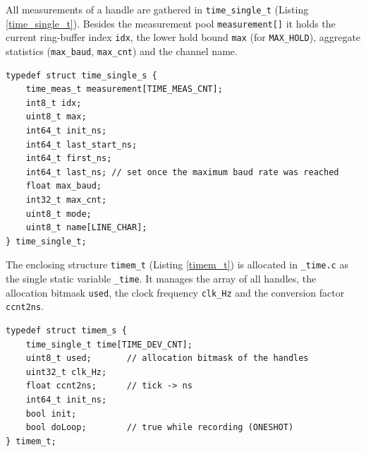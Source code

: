 All measurements of a handle are gathered in \verb|time_single_t|
(Listing \ref{time_single_t}). Besides the measurement pool
\verb|measurement[]| it holds the current ring-buffer index \verb|idx|, the
lower hold bound \verb|max| (for \verb|MAX_HOLD|), aggregate statistics
(\verb|max_baud|, \verb|max_cnt|) and the channel name.

\begin{listing}
\begin{verbatim}
typedef struct time_single_s {
    time_meas_t measurement[TIME_MEAS_CNT];
    int8_t idx;
    uint8_t max;
    int64_t init_ns;
    int64_t last_start_ns;
    int64_t first_ns;
    int64_t last_ns; // set once the maximum baud rate was reached
    float max_baud;
    int32_t max_cnt;
    uint8_t mode;
    uint8_t name[LINE_CHAR];
} time_single_t;
\end{verbatim}
\caption{Definition of the \texttt{time\_single\_t} structure}
\label{time_single_t}
\end{listing}

The enclosing structure \verb|timem_t| (Listing \ref{timem_t}) is allocated in
\verb|_time.c| as the single static variable \verb|_time|. It manages the
array of all handles, the allocation bitmask \verb|used|, the clock frequency
\verb|clk_Hz| and the conversion factor \verb|ccnt2ns|.

\begin{listing}
\begin{verbatim}
typedef struct timem_s {
    time_single_t time[TIME_DEV_CNT];
    uint8_t used;       // allocation bitmask of the handles
    uint32_t clk_Hz;
    float ccnt2ns;      // tick -> ns
    int64_t init_ns;
    bool init;
    bool doLoop;        // true while recording (ONESHOT)
} timem_t;
\end{verbatim}
\caption{Definition of the \texttt{timem\_t} structure}
\label{timem_t}
\end{listing}

